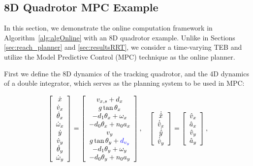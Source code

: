 \subsection{8D Quadrotor MPC Example \label{sec:resultsMPC}}

In this section, we demonstrate the online computation framework in Algorithm~\ref{alg:algOnline} with an 8D quadrotor example. Unlike in Sections \ref{sec:reach_planner} and \ref{sec:resultsRRT}, we consider a time-varying TEB and utilize the Model Predictive Control (MPC) technique as the online planner. 

First we define the 8D dynamics of the tracking quadrotor, and the 4D dynamics of a double integrator, which serves as the planning system to be used in MPC:

\begin{equation}
\label{eq:Quad8D_dyn}
\begin{aligned}
\begin{array}{c}
\left[
\begin{array}{c}
\dot x\\
\dot v_x\\
\dot \theta_x\\
\dot \omega_x\\
\dot y\\
\dot v_y\\
\dot \theta_y\\
\dot \omega_y
\end{array}
\right]
=
\left[
\begin{array}{c}
v_{x,s} + d_x\\
g \tan \theta_x\\
-d_1 \theta_x + \omega_x\\
-d_0 \theta_x + n_0 a_x\\
v_y\\
g \tan \theta_y + \MCnote{d_{v_y}}\\
-d_1 \theta_y + \omega_y\\
-d_0 \theta_y + n_0 a_y
\end{array}
\right], \quad
\left[
\begin{array}{c}
\dot {\hat x}\\
\dot {\hat v}_x\\
\dot {\hat y}\\
\dot {\hat v}_y\\
\end{array}
\right] 
=
\left[
\begin{array}{c}
\hat v_x\\
\hat a_x\\
\hat v_y\\
\hat a_y\\
\end{array}
\right],
\end{array}\\
\end{aligned}
\end{equation}
